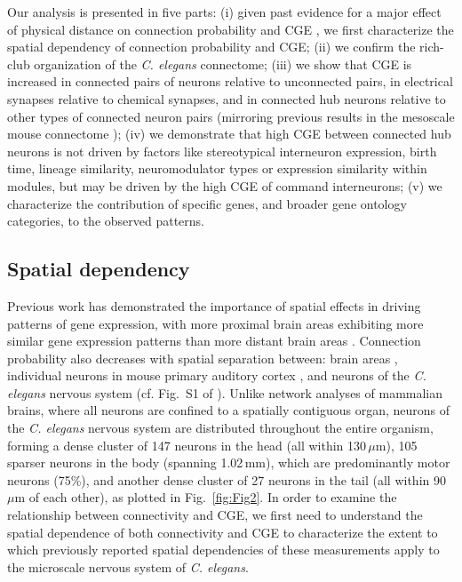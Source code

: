 \documentclass[10pt,letterpaper]{article}
\begin{document}
Our analysis is presented in five parts:
(i) given past evidence for a major effect of physical distance on connection probability and CGE \cite{Fulcher:2016ck}, we first characterize the spatial dependency of connection probability and CGE;
(ii) we confirm the rich-club organization of the \emph{C. elegans} connectome;
(iii) we show that CGE is increased in connected pairs of neurons relative to unconnected pairs, in electrical synapses relative to chemical synapses, and in connected hub neurons relative to other types of connected neuron pairs (mirroring previous results in the mesoscale mouse connectome \cite{Fulcher:2016ck});
(iv) we demonstrate that high CGE between connected hub neurons is not driven by factors like stereotypical interneuron expression, birth time, lineage similarity, neuromodulator types or expression similarity within modules, but may be driven by the high CGE of command interneurons;
(v) we characterize the contribution of specific genes, and broader gene ontology categories, to the observed patterns.


\subsection*{Spatial dependency}
Previous work has demonstrated the importance of spatial effects in driving patterns of gene expression, with more proximal brain areas exhibiting more similar gene expression patterns than more distant brain areas \cite{Krienen:2016eq, Fulcher:2016ck, Pantazatos:2016ir, Richiardi:2017hb}.
Connection probability also decreases with spatial separation between:
brain areas \cite{Horvat:2016ia, Wang:2016gg, Markov:2013jo, Henderson:2014fg, Fulcher:2016ck, Noori:2017ce},
individual neurons in mouse primary auditory cortex \cite{Levy:2012dy},
and neurons of the \emph{C. elegans} nervous system (cf. Fig.~S1 of \cite{Azulay:2016cg}).
Unlike network analyses of mammalian brains, where all neurons are confined to a spatially contiguous organ, neurons of the \emph{C. elegans} nervous system are distributed throughout the entire organism, forming a dense cluster of 147 neurons in the head (all within 130\,$\mu$m), 105 sparser neurons in the body (spanning 1.02\,mm), which are predominantly motor neurons (75\%), and another dense cluster of 27 neurons in the tail (all within 90\,$\mu$m of each other), as plotted in Fig.~\ref{fig:Fig2}.
In order to examine the relationship between connectivity and CGE, we first need to understand the spatial dependence of both connectivity and CGE to characterize the extent to which previously reported spatial dependencies of these measurements apply to the microscale nervous system of \emph{C. elegans}.
\end{document}
